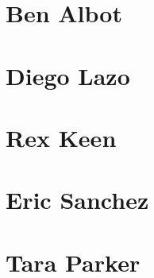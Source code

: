 \documentclass[12pt]{report}
\begin{document}
\section{Ben Albot}


\section{Diego Lazo}


\section{Rex Keen}


\section{Eric Sanchez}


\section{Tara Parker}

\end{document}
